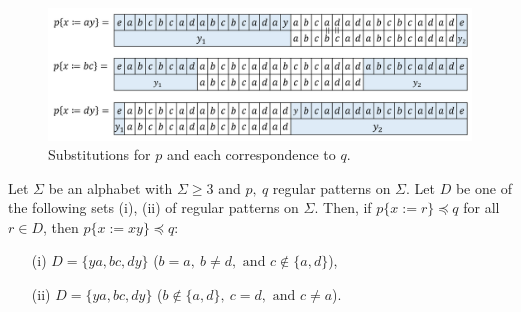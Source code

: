 \begin{figure}[t]
  \begin{center}
  \includegraphics[scale=0.45]{figs/Exam_b=a_c=d.png}
  \end{center}
  \caption{Substitutions for $p$ and each correspondence to $q$.}
  \label{b=aとc=dの例}
\end{figure}

\begin{lem}\label{片方}
Let $\Sigma$ be an alphabet with $\Sigma \ge 3$ and $p,~q$ regular patterns on $\Sigma$.
Let $D$ be one of the following sets \textrm{(i), (ii)} of regular patterns on $\Sigma$.
Then, if $p \{ x := r \} \preceq q$ for all $r \in D$, then $p \{ x := xy \} \preceq q$:
\begin{enumerate}
\item[{\rm (i)}] $D=\{ ya, bc, dy \}$ ($b = a,~b \not= d,\mbox{~and~}c \not\in \{a,d\}$),
\item[{\rm (ii)}] $D=\{ ya, bc, dy \}$ ($b \not\in \{a,d\},~c = d,\mbox{~and~} c \not = a$).
\end{enumerate}
\end{lem}

